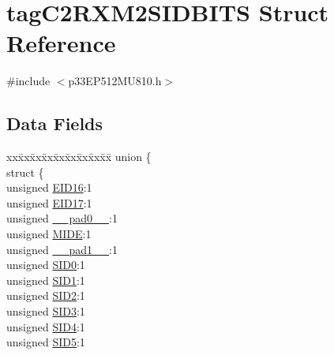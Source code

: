 \hypertarget{structtag_c2_r_x_m2_s_i_d_b_i_t_s}{}\section{tag\+C2\+R\+X\+M2\+S\+I\+D\+B\+I\+TS Struct Reference}
\label{structtag_c2_r_x_m2_s_i_d_b_i_t_s}


{\ttfamily \#include $<$p33\+E\+P512\+M\+U810.\+h$>$}

\subsection*{Data Fields}
\begin{DoxyCompactItemize}
\item 
\begin{tabbing}
xx\=xx\=xx\=xx\=xx\=xx\=xx\=xx\=xx\=\kill
union \{\\
\>struct \{\\
\>\>unsigned \hyperlink{structtag_c2_r_x_m2_s_i_d_b_i_t_s_a6dd5663b0c9838c56db040560ca0efa1}{EID16}:1\\
\>\>unsigned \hyperlink{structtag_c2_r_x_m2_s_i_d_b_i_t_s_aa648615464b0eb29967529333eee9fd9}{EID17}:1\\
\>\>unsigned \hyperlink{structtag_c2_r_x_m2_s_i_d_b_i_t_s_adf71f3d8410c1f1dbbc96680a92c49af}{\_\_pad0\_\_}:1\\
\>\>unsigned \hyperlink{structtag_c2_r_x_m2_s_i_d_b_i_t_s_a3febd6bba68dc9477425e6ef6020e88a}{MIDE}:1\\
\>\>unsigned \hyperlink{structtag_c2_r_x_m2_s_i_d_b_i_t_s_acaf2d0924a107ec6e8d2e31febaf66f9}{\_\_pad1\_\_}:1\\
\>\>unsigned \hyperlink{structtag_c2_r_x_m2_s_i_d_b_i_t_s_a1ca276ac15df60e1f7b9a6d0011ade93}{SID0}:1\\
\>\>unsigned \hyperlink{structtag_c2_r_x_m2_s_i_d_b_i_t_s_a3405d354f81391f879648f69f504dfc8}{SID1}:1\\
\>\>unsigned \hyperlink{structtag_c2_r_x_m2_s_i_d_b_i_t_s_ad744966dfc49307f731b7045b01b94e5}{SID2}:1\\
\>\>unsigned \hyperlink{structtag_c2_r_x_m2_s_i_d_b_i_t_s_a9345f3e64720be93e83d8dfc827f3f45}{SID3}:1\\
\>\>unsigned \hyperlink{structtag_c2_r_x_m2_s_i_d_b_i_t_s_aefb106fed4bb40e2c3c71ac612c554e3}{SID4}:1\\
\>\>unsigned \hyperlink{structtag_c2_r_x_m2_s_i_d_b_i_t_s_a0f221b3c9612231686bf87ccdcec8489}{SID5}:1\\

\end{tabbing}
\end{DoxyCompactItemize}
